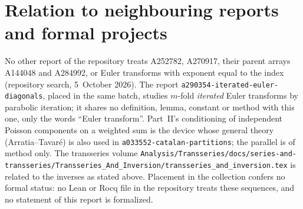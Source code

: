 \documentclass[11pt,letterpaper]{article}
\numberwithin{equation}{section}
\theoremstyle{definition}\newtheorem{definition}[theorem]{Definition}
\theoremstyle{remark}\newtheorem{remark}[theorem]{Remark}
\newcommand{\file}[1]{\nolinkurl{#1}}
\begin{document}
\section*{Relation to neighbouring reports and formal projects}\label{det:sec:neighbours}
No other report of the repository treats A252782, A270917, their parent arrays A144048 and A284992, or Euler transforms with exponent equal to the index (repository search, 5~October 2026). The report \file{a290354-iterated-euler-diagonals}, placed in the same batch, studies $m$-fold \emph{iterated} Euler transforms by parabolic iteration; it shares no definition, lemma, constant or method with this one, only the words ``Euler transform''. Part~II's conditioning of independent Poisson components on a weighted sum is the device whose general theory (Arratia--Tavar\'e) is also used in \file{a033552-catalan-partitions}; the parallel is of method only. The transseries volume \file{Analysis/Transseries/docs/series-and-transseries/Transseries_And_Inversion/transseries_and_inversion.tex} is related to the inverses as stated above. Placement in the collection confers no formal status: no Lean or Rocq file in the repository treats these sequences, and no statement of this report is formalized.
\clearpage
\end{document}
